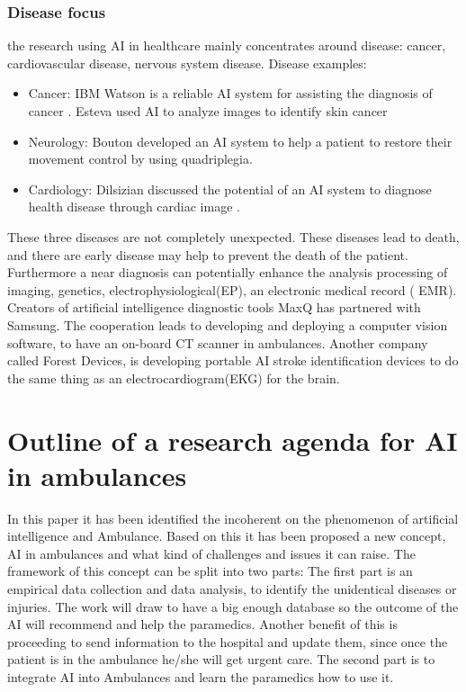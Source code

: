 \documentclass[fleqn,10pt]{wlscirep}
\begin{document}
\subsubsection{Disease focus}
the research using AI in healthcare mainly concentrates around disease: cancer, cardiovascular disease, nervous system disease. Disease examples: 
\begin{itemize}
\item Cancer: IBM Watson is a reliable AI system for assisting the diagnosis of cancer \cite{Kilde11}. Esteva used AI to analyze images to identify skin cancer \cite{Kilde12} 
\item Neurology: Bouton developed an AI system to help a patient to restore their movement control by using quadriplegia. 
\item Cardiology: Dilsizian discussed the potential of an AI system to diagnose health disease through cardiac image \cite{Kilde13}. 
\end{itemize}

These three diseases are not completely unexpected. These diseases lead to death, and there are early disease may help to prevent the death of the patient. Furthermore a near diagnosis can potentially enhance the analysis processing of imaging, genetics, electrophysiological(EP), an electronic medical record ( EMR). Creators of artificial intelligence diagnostic tools MaxQ has partnered with Samsung. The cooperation leads to developing and deploying a computer vision software, to have an on-board CT scanner in ambulances\cite{Kilde14}. Another company called Forest Devices\cite{Kilde14}, is developing portable AI stroke identification devices to do the same thing as an electrocardiogram(EKG) for the brain. 


\section{Outline of a research agenda for AI in ambulances}
In this paper it has been identified the incoherent on the phenomenon of artificial intelligence and Ambulance. Based on this it has been proposed a new concept, AI in ambulances and what kind of challenges and issues it can raise. The framework of this concept can be split into two parts: The first part is an empirical data collection and data analysis, to identify the unidentical diseases or injuries. The work will draw to have a big enough database so the outcome of the AI will recommend and help the paramedics. Another benefit of this is proceeding to send information to the hospital and update them, since once the patient is in the ambulance he/she will get urgent care. The second part is to integrate AI into Ambulances and learn the paramedics how to use it. 
\end{document}
